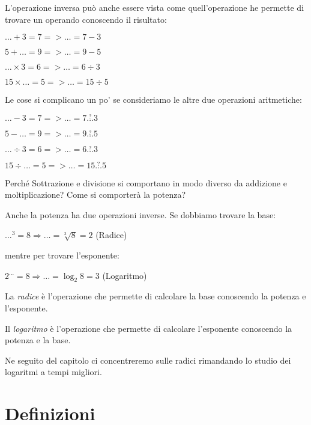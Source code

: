 L'operazione inversa può anche essere vista come quell'operazione he permette 
di trovare un operando conoscendo il risultato:

$\dots + 3 = 7 => \dots = 7 - 3$

$5 + \dots = 9 => \dots = 9 - 5$

$\dots \times 3 = 6 => \dots = 6 \div 3$

$15 \times \dots = 5 => \dots = 15 \div 5$

Le cose si complicano un po' se consideriamo le altre due operazioni 
aritmetiche:

$\dots - 3 = 7 => \dots = 7 \overset{?}{\dots} 3$

$5 - \dots = 9 => \dots = 9 \overset{?}{\dots} 5$

$\dots \div 3 = 6 => \dots = 6 \overset{?}{\dots} 3$

$15 \div \dots = 5 => \dots = 15 \overset{?}{\dots} 5$

Perché Sottrazione e divisione si comportano in modo diverso da addizione e 
moltiplicazione? Come si comporterà la potenza?

Anche la potenza ha due operazioni inverse. Se dobbiamo trovare la base:

$\dots ^3 = 8 \Rightarrow \dots = \sqrt[3]{8} = 2$ (Radice)

mentre per trovare l'esponente:

$2 ^{\dots} = 8 \Rightarrow \dots = \log_{2}{8} = 3$ (Logaritmo)

\begin{definizione}
La \emph{radice} è l'operazione che permette di calcolare la base conoscendo
la potenza e l'esponente.
\end{definizione}

\begin{definizione}
Il \emph{logaritmo} è l'operazione che permette di calcolare l'esponente
conoscendo la potenza e la base.
\end{definizione}

Ne seguito del capitolo ci concentreremo sulle radici rimandando lo studio
dei logaritmi a tempi migliori. 

\section{Definizioni}
\label{sec:radicali_definizioni}

